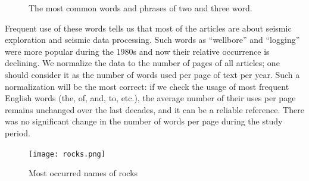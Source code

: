 \documentclass[geosciences,article,submit,moreauthors,pdftex]{Definitions/mdpi}
\begin{document}
\begin{figure}[ht!]
\begin{minipage}{0.4\linewidth}
\end{minipage}

\caption{The most common words and phrases of two and three word.}
\label{grams}
\end{figure}


Frequent use of these words tells us that most of the articles are about seismic exploration and seismic data processing. Such words as “wellbore” and “logging” were more popular during the 1980s and now their relative occurrence is declining. We normalize the data to the number of pages of all articles; one should consider it as the number of words used per page of text per year.  Such a normalization will be the most correct: if we check the usage of most frequent English words (the, of, and, to, etc.), the average number of their uses per page remains unchanged over the last decades, and it can be a reliable reference. There was no significant change in the number of words per page during the study period. 

\begin{figure}[ht!]
\centering
\texttt{[image: rocks.png]}
\caption{Most occurred names of rocks}
\label{rocks}
\end{figure}
 
\end{document}
